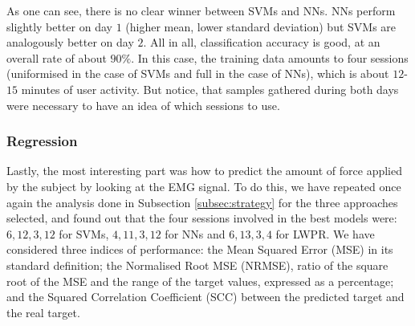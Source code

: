 As one can see, there is no clear winner between SVMs and NNs. NNs
perform slightly better on day $1$ (higher mean, lower standard
deviation) but SVMs are analogously better on day $2$. All in all,
classification accuracy is good, at an overall rate of about
$90\%$. In this case, the training data amounts to four sessions
(uniformised in the case of SVMs and full in the case of NNs), which
is about $12$-$15$ minutes of user activity. But notice, that samples
gathered during both days were necessary to have an idea of which
sessions to use.

\subsubsection{Regression}

Lastly, the most interesting part was how to predict the amount of
force applied by the subject by looking at the EMG signal. To do this,
we have repeated once again the analysis done in Subsection
\ref{subsec:strategy} for the three approaches selected, and found out
that the four sessions involved in the best models were: $6,12,3,12$
for SVMs, $4,11,3,12$ for NNs and $6,13,3,4$ for LWPR. We have
considered three indices of performance: the Mean Squared Error (MSE)
in its standard definition; the Normalised Root MSE (NRMSE), ratio of
the square root of the MSE and the range of the target values,
expressed as a percentage; and the Squared Correlation Coefficient
(SCC) between the predicted target and the real target.

